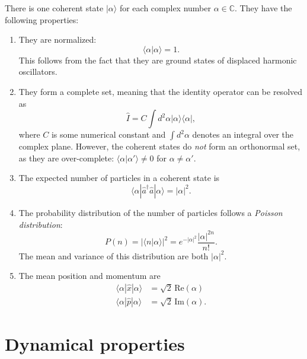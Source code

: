 \documentclass[pra,12pt]{revtex4}
\begin{document}
There is one coherent state $|\alpha\rangle$ for each complex number
$\alpha \in \mathbb{C}$.  They have the following properties:
\begin{enumerate}
\item They are normalized:
  \begin{equation}
    \langle\alpha|\alpha\rangle = 1.
    \label{normalization}
  \end{equation}
  This follows from the fact that they are ground states of displaced
  harmonic oscillators.

\item They form a complete set, meaning that the identity operator can
  be resolved as
  \begin{equation}
    \hat{I} = C \int d^2\alpha |\alpha\rangle\langle\alpha|,
  \end{equation}
  where $C$ is some numerical constant and $\int d^2\alpha$ denotes an
  integral over the complex plane.  However, the coherent states do
  \textit{not} form an orthonormal set, as they are over-complete:
  $\langle\alpha|\alpha'\rangle \ne 0$ for $\alpha \ne \alpha'$.

\item The expected number of particles in a coherent state is
  \begin{equation}
    \langle\alpha| \hat{a}^\dagger\hat{a} | \alpha\rangle
    = |\alpha|^2.
  \end{equation}

\item The probability distribution of the number of particles follows
  a \textit{Poisson distribution}:
  \begin{equation}
    P(n) = |\langle n | \alpha\rangle|^2 = e^{-|\alpha|^2} \frac{|\alpha|^{2n}}{n!}.
  \end{equation}
  The mean and variance of this distribution are both $|\alpha|^2$.

\item The mean position and momentum are
  \begin{align}
    \langle \alpha | \hat{x}|\alpha\rangle &= \sqrt{2} \, \mathrm{Re}(\alpha) 
    \label{x} \\
    \langle \alpha | \hat{p}|\alpha\rangle &= \sqrt{2} \, \mathrm{Im}(\alpha).
    \label{p}
  \end{align}
\end{enumerate}

\section{Dynamical properties}
\end{document}
